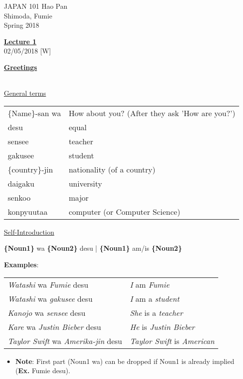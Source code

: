\documentclass{article}
\begin{document}
\noindent
{JAPAN 101 \hfill Hao Pan}\\
{Shimoda, Fumie}\\
{Spring 2018}


\begin{center}
\underline{\bf \large Lecture 1}\\
\noindent
{\hfill 02/05/2018 [W]}
\end{center}

\underline{\bf Greetings}\\
\\


\begin{tcolorbox}[colback=green!35!white]
\underline{General terms}\\

\begin{tabular}{ l | l }
\{Name\}-san wa & How about you? (After they ask 'How are you?')\\
desu & equal\\
sensee & teacher\\
gakusee & student\\
\{country\}-jin & nationality (of a country)\\
daigaku & university\\
senkoo & major\\
konpyuutaa & computer (or Computer Science)\\
\end{tabular}
\end{tcolorbox}


\underline{Self-Introduction}

{\bf \{Noun1\}} wa {\bf \{Noun2\}} desu | {\bf \{Noun1\}} am/is {\bf \{Noun2\}}


\begin{tcolorbox}
\textbf{Examples}:

\begin{tabular}{ l | l }
\textit{Watashi} wa \textit{Fumie} desu & \textit{I} am \textit{Fumie}\\
\textit{Watashi} wa \textit{gakusee} desu & \textit{I} am a \textit{student}\\
\textit{Kanojo} wa \textit{sensee} desu & \textit{She} is a \textit{teacher}\\
\textit{Kare} wa \textit{Justin Bieber} desu & \textit{He} is \textit{Justin Bieber}\\
\textit{Taylor Swift} wa \textit{Amerika-jin} desu & \textit{Taylor Swift} is \textit{American}\\
\end{tabular}

\begin{itemize}
	\item {\bf Note}: First part (Noun1 wa) can be dropped if Noun1 is already implied (\textbf{Ex.} Fumie desu).
\end{itemize}
\end{tcolorbox}
\end{document}

